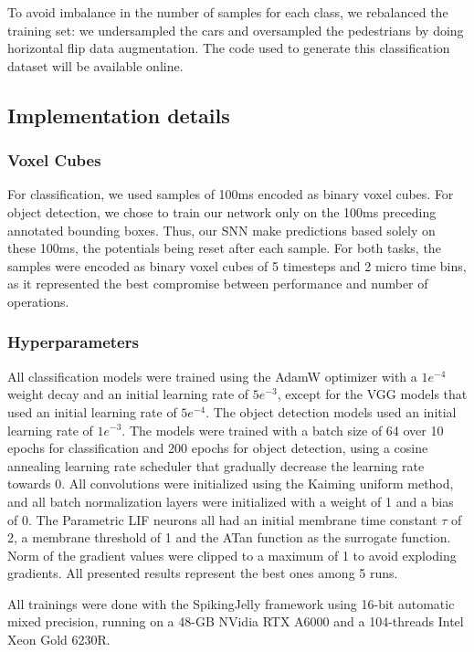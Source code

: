 \documentclass[conference]{IEEEtran}
\begin{document}
To avoid imbalance in the number of samples for each class, we rebalanced the training set: we undersampled the cars and oversampled the pedestrians by doing horizontal flip data augmentation. The code used to generate this classification dataset will be available online.

\subsection{Implementation details}
\subsubsection{Voxel Cubes \label{voxel}}
For classification, we used samples of 100ms encoded as binary voxel cubes. For object detection, we chose to train our network only on the 100ms preceding annotated bounding boxes. Thus, our SNN make predictions based solely on these 100ms, the potentials being reset after each sample. 
For both tasks, the samples were encoded as binary voxel cubes of 5 timesteps and 2 micro time bins, as it represented the best compromise between performance and number of operations. 

\subsubsection{Hyperparameters}
All classification models were trained using the AdamW optimizer with a $1e^{-4}$ weight decay and an initial learning rate of $5e^{-3}$, except for the VGG models that used an initial learning rate of $5e^{-4}$. The object detection models used an initial learning rate of $1e^{-3}$. The models were trained with a batch size of 64 over 10 epochs for classification and 200 epochs for object detection, using a cosine annealing learning rate scheduler that gradually decrease the learning rate towards 0. All convolutions were initialized using the Kaiming uniform method, and all batch normalization layers were initialized with a weight of 1 and a bias of 0. The Parametric LIF neurons all had an initial membrane time constant $\tau$ of 2, a membrane threshold of 1 and the ATan function as the surrogate function. Norm of the gradient values were clipped to a maximum of 1 to avoid exploding gradients. 
All presented results represent the best ones among 5 runs. 

All trainings were done with the SpikingJelly framework \cite{spikingjelly} using 16-bit automatic mixed precision, running on a 48-GB NVidia RTX A6000 and a 104-threads Intel Xeon Gold 6230R.
\end{document}
